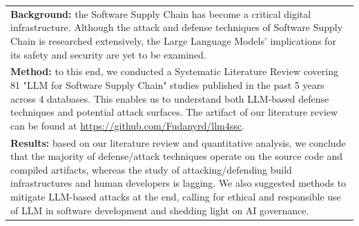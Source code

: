 \begin{tabular}{p{\linewidth}}
\textbf{Background:} the Software Supply Chain has become a critical
digital infrastructure. Although the attack and defense techniques of
Software Supply Chain is researched extensively, the Large Language
Models' implications for its safety and security are yet to
be examined.

\\

\textbf{Method:} to this end, we conducted a Systematic Literature
Review covering 81 "LLM for Software Supply Chain" studies published
in the past 5 years across 4 databases. This enables us to understand both
LLM-based defense techniques and potential attack surfaces.
The artifact of our literature review can be found at 
\url{https://github.com/Fudanyrd/llm4ssc}.

\\

\textbf{Results:} based on our literature review and
quantitative analysis,
we conclude that the majority of defense/attack techniques
operate on the source code and compiled artifacts, whereas the
study of attacking/defending build infrastructures and  human
developers is lagging. We also suggested methods to mitigate
LLM-based attacks at the end, calling for ethical and responsible
use of LLM in software development and shedding light on
AI governance.


\end{tabular}

